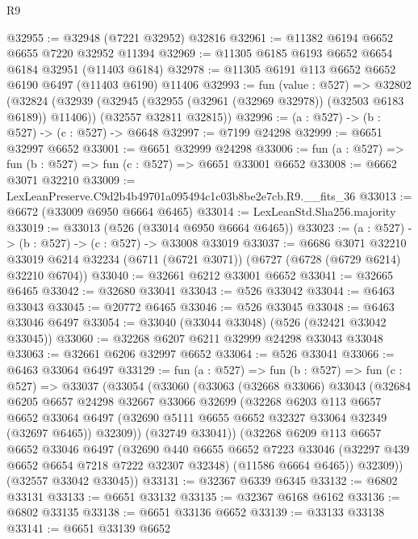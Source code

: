 \begin{lexlean}{R9}
\begin{coremodule}
@32955 := @32948 (@7221 @32952) @32816
@32961 := @11382 @6194 @6652 @6655 @7220 @32952 @11394
@32969 := @11305 @6185 @6193 @6652 @6654 @6184 @32951 (@11403 @6184)
@32978 := @11305 @6191 @113 @6652 @6652 @6190 @6497 (@11403 @6190) @11406
@32993 := fun (value : @527) =>
  @32802
    (@32824
      (@32939 (@32945 (@32955 (@32961 (@32969 @32978)) (@32503 @6183 @6189)) @11406))
      (@32557 @32811 @32815))
@32996 := (a : @527) -> (b : @527) -> (c : @527) -> @6648
@32997 := @7199 @24298
@32999 := @6651 @32997 @6652
@33001 := @6651 @32999 @24298
@33006 := fun (a : @527) => fun (b : @527) => fun (c : @527) => @6651 @33001 @6652
@33008 := @6662 @3071 @32210
@33009 := LexLeanPreserve.C9d2b4b49701a095494c1c03b8be2e7cb.R9.__fits_36
@33013 := @6672 (@33009 @6950 @6664 @6465)
@33014 := LexLeanStd.Sha256.majority
@33019 := @33013 (@526 (@33014 @6950 @6664 @6465))
@33023 := (a : @527) -> (b : @527) -> (c : @527) -> @33008 @33019
@33037 := @6686
    @3071
    @32210
    @33019
    @6214
    @32234
    (@6711 (@6721 @3071))
    (@6727 (@6728 (@6729 @6214) @32210 @6704))
@33040 := @32661 @6212 @33001 @6652
@33041 := @32665 @6465
@33042 := @32680 @33041
@33043 := @526 @33042
@33044 := @6463 @33043
@33045 := @20772 @6465
@33046 := @526 @33045
@33048 := @6463 @33046 @6497
@33054 := @33040 (@33044 @33048) (@526 (@32421 @33042 @33045))
@33060 := @32268 @6207 @6211 @32999 @24298 @33043 @33048
@33063 := @32661 @6206 @32997 @6652
@33064 := @526 @33041
@33066 := @6463 @33064 @6497
@33129 := fun (a : @527) =>
  fun (b : @527) =>
  fun (c : @527) =>
  @33037
    (@33054
      (@33060
        (@33063
          (@32668 @33066)
          @33043
          (@32684
            @6205
            @6657
            @24298
            @32667
            @33066
            @32699
            (@32268
              @6203
              @113
              @6657
              @6652
              @33064
              @6497
              (@32690 @5111 @6655 @6652 @32327 @33064 @32349 (@32697 @6465))
              @32309))
          (@32749 @33041))
        (@32268
          @6209
          @113
          @6657
          @6652
          @33046
          @6497
          (@32690
            @440
            @6655
            @6652
            @7223
            @33046
            (@32297 @439 @6652 @6654 @7218 @7222 @32307 @32348)
            (@11586 @6664 @6465))
          @32309))
      (@32557 @33042 @33045))
@33131 := @32367 @6339 @6345
@33132 := @6802 @33131
@33133 := @6651 @33132
@33135 := @32367 @6168 @6162
@33136 := @6802 @33135
@33138 := @6651 @33136 @6652
@33139 := @33133 @33138
@33141 := @6651 @33139 @6652

\end{coremodule}
\end{lexlean}
